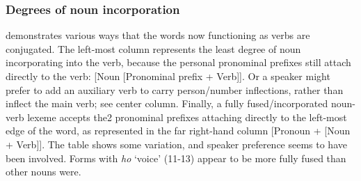 \documentclass[output=paper]{LSP/langsci}
\begin{document}
\subsubsection{Degrees of  noun incorporation}
 demonstrates various ways that the words now functioning as  verbs are conjugated.  The left-most column represents the least degree of noun incorporating into the verb, because the personal pronominal prefixes still attach directly to the verb: [Noun [Pronominal prefix + Verb]]. Or a speaker might prefer to add an auxiliary verb to carry person/number inflections, rather than inflect the main verb; see center column. Finally, a fully fused/incorporated noun-verb lexeme accepts the2 pronominal prefixes attaching directly to the left-most edge of the word, as represented in the far right-hand column [Pronoun + [Noun + Verb]].  The table shows some variation, and speaker preference seems to have been involved. Forms with \textit{ho} `voice' (11-13) appear to be more fully fused than other nouns were.    
\end{document}
